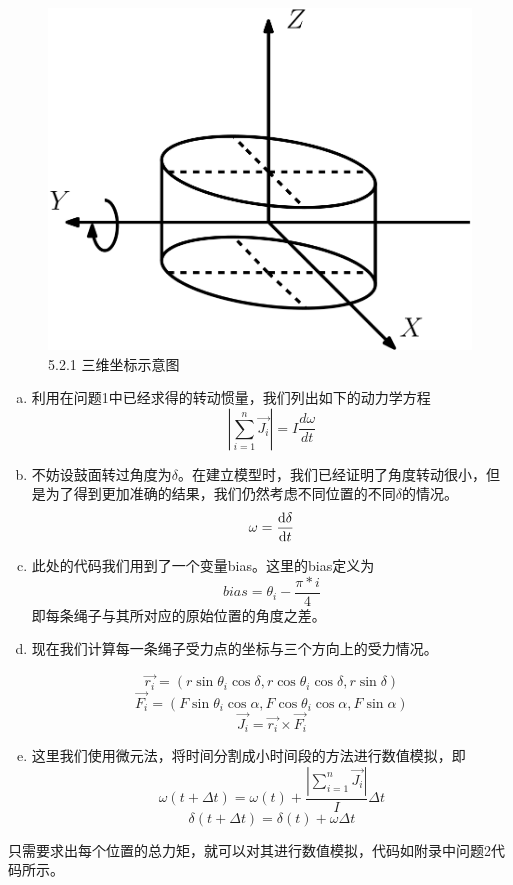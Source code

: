 \documentclass[nocover]{cumcmart}%
\begin{document}
\begin{figure}[h!]
    \centering
    \includegraphics[width=0.4\linewidth]{figures/f2.png}
    \caption{5.2.1 三维坐标示意图}
    \label{5.2.1 三维坐标示意图}
\end{figure}
\begin{enumerate}[(a)]
    \item 

利用在问题1中已经求得的转动惯量，我们列出如下的动力学方程
$$|\sum_{i = 1}^{n} \vec{J_i}| = I\frac{d\omega}{dt}$$

\item
不妨设鼓面转过角度为$\delta$。在建立模型时，我们已经证明了角度转动很小，但是为了得到更加准确的结果，我们仍然考虑不同位置的不同$\delta$的情况。
$$\omega = \frac{{\rm d}\delta}{{\rm d}t}$$

\item
此处的代码我们用到了一个变量bias。这里的bias定义为
$$bias = \theta_i - \frac{\pi*i}{4}$$
即每条绳子与其所对应的原始位置的角度之差。

\item
现在我们计算每一条绳子受力点的坐标与三个方向上的受力情况。

$$\vec{r_i} = (r\sin{\theta_i}\cos{\delta}, r\cos{\theta_i}\cos{\delta}, r\sin{\delta})$$
$$\vec{F_i} = (F\sin{\theta_i}\cos{\alpha}, F\cos{\theta_i}\cos{\alpha}, F\sin{\alpha})$$
$$\vec{J_i} = \vec{r_i} \times \vec{F_i}$$
\item
这里我们使用微元法，将时间分割成小时间段的方法进行数值模拟，即
$$\omega(t+\Delta t) = \omega(t) + \frac{|\sum_{i = 1}^{n} \vec{J_i}|}{I} \Delta t$$
$$\delta(t+\Delta t) = \delta(t) + \omega \Delta t$$

\end{enumerate}
只需要求出每个位置的总力矩，就可以对其进行数值模拟，代码如附录中问题2代码所示。
\end{document}
